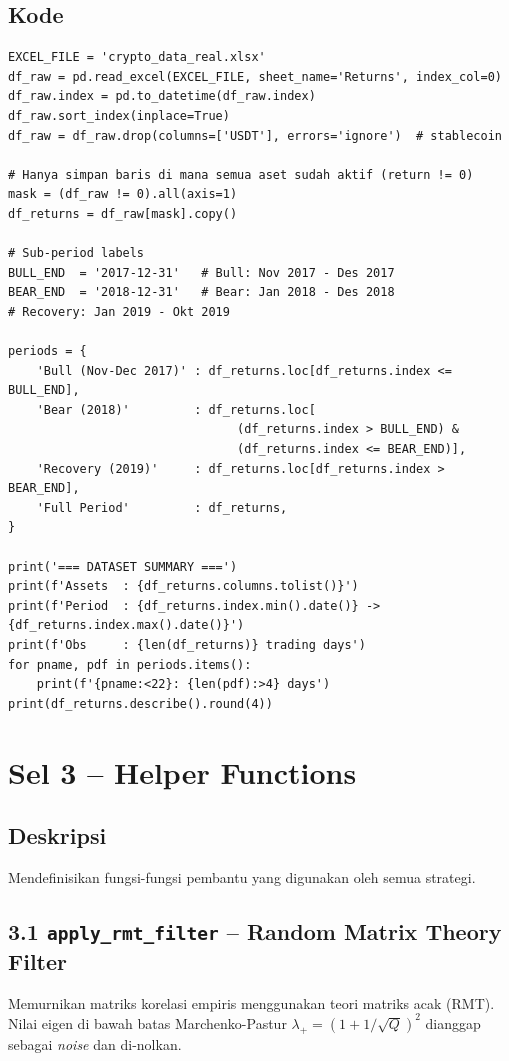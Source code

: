 \documentclass[12pt,a4paper]{article}
\begin{document}
\subsection{Kode}
\begin{lstlisting}[caption={Load dan preparasi data}]
EXCEL_FILE = 'crypto_data_real.xlsx'
df_raw = pd.read_excel(EXCEL_FILE, sheet_name='Returns', index_col=0)
df_raw.index = pd.to_datetime(df_raw.index)
df_raw.sort_index(inplace=True)
df_raw = df_raw.drop(columns=['USDT'], errors='ignore')  # stablecoin

# Hanya simpan baris di mana semua aset sudah aktif (return != 0)
mask = (df_raw != 0).all(axis=1)
df_returns = df_raw[mask].copy()

# Sub-period labels
BULL_END  = '2017-12-31'   # Bull: Nov 2017 - Des 2017
BEAR_END  = '2018-12-31'   # Bear: Jan 2018 - Des 2018
# Recovery: Jan 2019 - Okt 2019

periods = {
    'Bull (Nov-Dec 2017)' : df_returns.loc[df_returns.index <= BULL_END],
    'Bear (2018)'         : df_returns.loc[
                                (df_returns.index > BULL_END) &
                                (df_returns.index <= BEAR_END)],
    'Recovery (2019)'     : df_returns.loc[df_returns.index > BEAR_END],
    'Full Period'         : df_returns,
}

print('=== DATASET SUMMARY ===')
print(f'Assets  : {df_returns.columns.tolist()}')
print(f'Period  : {df_returns.index.min().date()} -> {df_returns.index.max().date()}')
print(f'Obs     : {len(df_returns)} trading days')
for pname, pdf in periods.items():
    print(f'{pname:<22}: {len(pdf):>4} days')
print(df_returns.describe().round(4))
\end{lstlisting}

\section{Sel 3 -- Helper Functions}

\subsection{Deskripsi}
Mendefinisikan fungsi-fungsi pembantu yang digunakan oleh semua strategi.

\subsection{3.1 \texttt{apply\_rmt\_filter} -- Random Matrix Theory Filter}
Memurnikan matriks korelasi empiris menggunakan teori matriks acak (RMT).
Nilai eigen di bawah batas Marchenko-Pastur $\lambda_+ = (1 + 1/\sqrt{Q})^2$
dianggap sebagai \textit{noise} dan di-nolkan.
\end{document}
